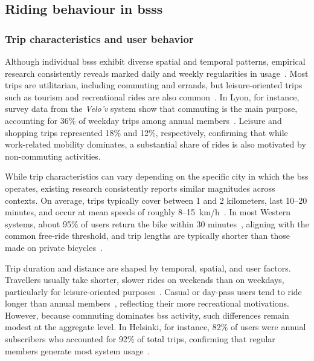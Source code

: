         
\subsection[Riding behaviour in BSSs]{Riding behaviour in \acp{bss}}

    \subsubsection{Trip characteristics and user behavior}


Although individual \acp{bss} exhibit diverse spatial and temporal patterns, empirical research consistently reveals marked daily and weekly regularities in usage~\cite{Fishman2016}. Most trips are utilitarian, including commuting and errands, but leisure-oriented trips such as tourism and recreational rides are also common~\cite{Ricci2015, Fishman2016, Willberg2021, CapitalBikeshare2013, Xu2019_Unravel, Buck2013, Raux2017, Lin2018}. In Lyon, for instance, survey data from the \textit{Velo’v} system show that commuting is the main purpose, accounting for 36\% of weekday trips among annual members~\cite{Raux2017}. Leisure and shopping trips represented 18\% and 12\%, respectively, confirming that while work-related mobility dominates, a substantial share of rides is also motivated by non-commuting activities.


While trip characteristics can vary depending on the specific city in which the \ac{bss} operates, existing research consistently reports similar magnitudes across contexts. On average, trips typically cover between 1 and 2 kilometers, last 10–20 minutes, and occur at mean speeds of roughly 8–15~km/h~\cite{Fishman2014, Zhang2016Bicycle, Levy2019, Zhao2015, MateoBabiano2016, FaghihImani2017_Hail, Yang2024}. In most Western systems, about 95\% of users return the bike within 30 minutes~\cite{Zhao2015, MateoBabiano2016}, aligning with the common free-ride threshold, and trip lengths are typically shorter than those made on private bicycles~\cite{CastilloManzano2015}. 

Trip duration and distance are shaped by temporal, spatial, and user factors. Travellers usually take shorter, slower rides on weekends than on weekdays, particularly for leisure-oriented purposes~\cite{MateoBabiano2016}. Casual or day-pass users tend to ride longer than annual members~\cite{Buck2013}, reflecting their more recreational motivations. However, because commuting dominates \ac{bss} activity, such differences remain modest at the aggregate level. In Helsinki, for instance, 82\% of users were annual subscribers who accounted for 92\% of total trips, confirming that regular members generate most system usage~\cite{Willberg2021}.

